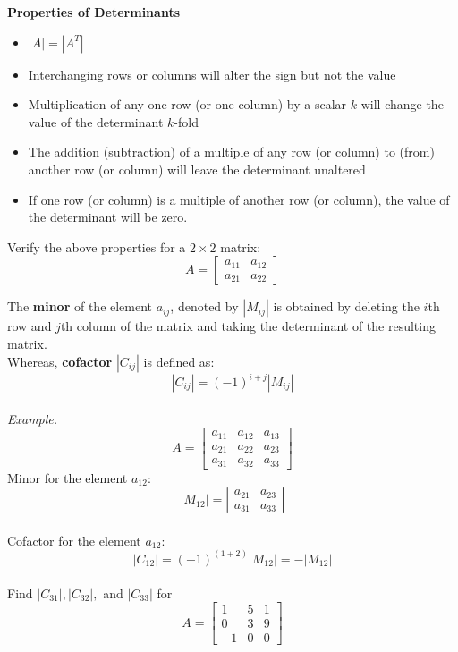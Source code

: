 \documentclass{./../../latex/handout}
\begin{document}
\newpage
\textbf{Properties of Determinants}
\begin{itemize}
\item[1.] $ |A| = |A^T|$ 
\item[2.] Interchanging rows or columns will alter the sign but not the value
\item[3.] Multiplication of any one row (or one column) by a scalar $k$ will change the value of the determinant $k$-fold
\item[4.] The addition (subtraction) of a multiple of any row (or column) to (from) another row (or column) will leave the determinant unaltered
\item[5.] If one row (or column) is a multiple of another row (or column), the value of the determinant will be zero. 
\end{itemize}

\vspace{2em}
Verify the above properties for a $2 \times 2$ matrix: 
 \[ A=\left[\begin{array}{ll}a_{11} & a_{12} \\ a_{21} & a_{22}\end{array}\right] \]


\newpage
The \textbf{minor} of the element $a_{ij}$, denoted by $|M_{ij}|$ is obtained by deleting the $i$th row and $j$th column of the matrix and taking the determinant of the resulting matrix. \\

Whereas, \textbf{cofactor} $|C_{ij}|$ is defined as:
\[ |C_{ij}| = (-1)^{i+j} |M_{ij}| \]\\

\textit{Example.} \[
A=\left[\begin{array}{lll}
a_{11} & a_{12} & a_{13} \\
a_{21} & a_{22} & a_{23} \\
a_{31} & a_{32} & a_{33}
\end{array}\right]
\]
Minor for the element $a_{12}$: 
\[ \left|M_{12}\right|=\left|\begin{array}{ll}a_{21} & a_{23} \\ a_{31} & a_{33}\end{array}\right| \] \\
Cofactor for the element $a_{12}$: 
\[ \left|C_{12}\right| = (-1)^{(1+2)}  \left|M_{12}\right| = -  \left|M_{12}\right| \] \\
Find $|C_{31}|,  |C_{32}|,$ and $|C_{33}|$ for \[
A=\left[\begin{array}{ccc}
1 & 5 & 1 \\
0 & 3 & 9 \\
-1 & 0 & 0
\end{array}\right]
\]
\end{document}
